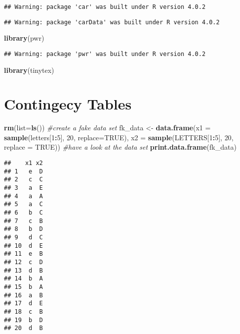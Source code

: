 \documentclass[]{article}
\newenvironment{Shaded}{\begin{snugshade}}{\end{snugshade}}
\newcommand{\CommentTok}[1]{\textcolor[rgb]{0.56,0.35,0.01}{\textit{#1}}}
\newcommand{\DataTypeTok}[1]{\textcolor[rgb]{0.13,0.29,0.53}{#1}}
\newcommand{\DecValTok}[1]{\textcolor[rgb]{0.00,0.00,0.81}{#1}}
\newcommand{\KeywordTok}[1]{\textcolor[rgb]{0.13,0.29,0.53}{\textbf{#1}}}
\newcommand{\NormalTok}[1]{#1}
\newcommand{\OperatorTok}[1]{\textcolor[rgb]{0.81,0.36,0.00}{\textbf{#1}}}
\newcommand{\OtherTok}[1]{\textcolor[rgb]{0.56,0.35,0.01}{#1}}
\newcommand{\StringTok}[1]{\textcolor[rgb]{0.31,0.60,0.02}{#1}}
\begin{document}
\begin{verbatim}
## Warning: package 'car' was built under R version 4.0.2
\end{verbatim}

\begin{verbatim}
## Warning: package 'carData' was built under R version 4.0.2
\end{verbatim}

\begin{Shaded}
\begin{Highlighting}[]
\KeywordTok{library}\NormalTok{(pwr)}
\end{Highlighting}
\end{Shaded}

\begin{verbatim}
## Warning: package 'pwr' was built under R version 4.0.2
\end{verbatim}

\begin{Shaded}
\begin{Highlighting}[]
\KeywordTok{library}\NormalTok{(tinytex)}
\end{Highlighting}
\end{Shaded}

\hypertarget{contingecy-tables}{%
\section{Contingecy Tables}\label{contingecy-tables}}

\begin{Shaded}
\begin{Highlighting}[]
\KeywordTok{rm}\NormalTok{(}\DataTypeTok{list=}\KeywordTok{ls}\NormalTok{())}
\CommentTok{#create a fake data set}
\NormalTok{fk_data <-}\StringTok{ }\KeywordTok{data.frame}\NormalTok{(}\DataTypeTok{x1 =} \KeywordTok{sample}\NormalTok{(letters[}\DecValTok{1}\OperatorTok{:}\DecValTok{5}\NormalTok{], }\DecValTok{20}\NormalTok{, }\DataTypeTok{replace=}\OtherTok{TRUE}\NormalTok{), }
                      \DataTypeTok{x2 =} \KeywordTok{sample}\NormalTok{(LETTERS[}\DecValTok{1}\OperatorTok{:}\DecValTok{5}\NormalTok{], }\DecValTok{20}\NormalTok{, }\DataTypeTok{replace =} \OtherTok{TRUE}\NormalTok{))}
\CommentTok{#have a look at the data set}
\KeywordTok{print.data.frame}\NormalTok{(fk_data)}
\end{Highlighting}
\end{Shaded}

\begin{verbatim}
##    x1 x2
## 1   e  D
## 2   c  C
## 3   a  E
## 4   a  A
## 5   a  C
## 6   b  C
## 7   c  B
## 8   b  D
## 9   d  C
## 10  d  E
## 11  e  B
## 12  c  D
## 13  d  B
## 14  b  A
## 15  b  A
## 16  a  B
## 17  d  E
## 18  c  B
## 19  b  D
## 20  d  B
\end{verbatim}
\end{document}
